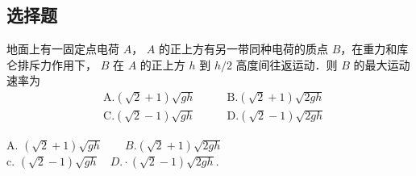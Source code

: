 
\subsection{选择题}
地面上有一固定点电荷 $A$， $A$ 的正上方有另一带同种电荷的质点 $B$，在重力和库仑排斥力作用下， $B$ 在 $A$ 的正上方 $h$ 到 $h/2$ 高度间往返运动．则 $B$ 的最大运动速率为\\
\begin{equation}
\begin{aligned}
&\mathrm{A}. (\sqrt{2}+1) \sqrt{g h}\qquad
&\mathrm{B}. (\sqrt{2}+1) \sqrt{2 g h}\\
&\mathrm{C}. (\sqrt{2}-1) \sqrt{g h}\quad
&\mathrm{D}. (\sqrt{2}-1) \sqrt{2 g h}
\end{aligned}
\end{equation}

A. $(\sqrt{2}+1) \sqrt{g h}\qquad
B. (\sqrt{2}+1) \sqrt{2 g h}$\\
c. $(\sqrt{2}-1) \sqrt{g h}\quad
D. \cdot(\sqrt{2}-1) \sqrt{2 g h}$.